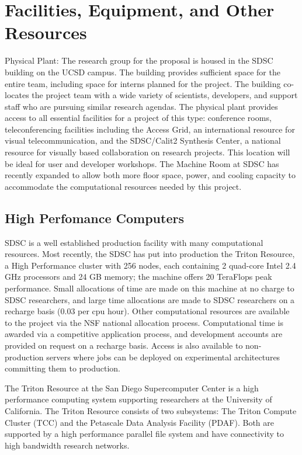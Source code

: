 \section{Facilities, Equipment, and Other Resources}
 

Physical Plant: The research group for the proposal is housed in the
SDSC building on the UCSD campus. The building provides sufficient
space for the entire team, including space for interns planned for the
project. The building co-locates the project team with a wide variety
of scientists, developers, and support staff who are pursuing similar
research agendas. The physical plant provides access to all essential
facilities for a project of this type: conference rooms,
teleconferencing facilities including the Access Grid, an
international resource for visual telecommunication, and the
SDSC/Calit2 Synthesis Center, a national resource for visually based
collaboration on research projects. This location will be ideal for
user and developer workshops. The Machine Room at SDSC has recently
expanded to allow both more floor space, power, and cooling capacity
to accommodate the computational resources needed by this project.

 

\subsection{High Perfomance Computers}

SDSC is a well established production facility with many computational
resources. Most recently, the SDSC has put into production the Triton
Resource, a High Performance cluster with 256 nodes, each containing 2
quad-core Intel 2.4 GHz processors and 24 GB memory; the machine
offers 20 TeraFlops peak performance. Small allocations of time are
made on this machine at no charge to SDSC researchers, and large time
allocations are made to SDSC researchers on a recharge basis (0.03 per
cpu hour). Other computational resources are available to the project
via the NSF national allocation process. Computational time is awarded
via a competitive application process, and development accounts are
provided on request on a recharge basis. Access is also available to
non-production servers where jobs can be deployed on experimental
architectures committing them to production.


The Triton Resource at the San Diego Supercomputer Center is a high
performance computing system supporting researchers at the University
of California. The Triton Resource consists of two subsystems: The
Triton Compute Cluster (TCC) and the Petascale Data Analysis Facility
(PDAF). Both are supported by a high performance parallel file system
and have connectivity to high bandwidth research networks.

